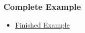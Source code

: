 \begin{frame}[fragile]
    \frametitle{Complete Example}
% 
% 
    \begin{itemize}
        \item \href{https://cfsamson.github.io/books-futures-explained/8_finished_example.html#our-finished-code}{Finished Example}
    \end{itemize}
\end{frame}

